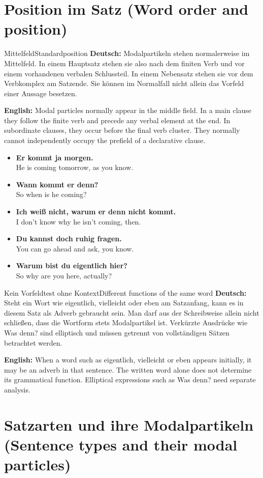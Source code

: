\documentclass[a4paper,11pt]{article}
\newcommand{\GermanText}[1]{\textbf{Deutsch: }#1\par}
\newcommand{\EnglishText}[1]{{\small\color{SoftGray}\textbf{English: }#1\par}}
\newcommand{\ExampleItem}[2]{\item \textbf{#1}\\{\small\color{SoftGray}#2}}
\begin{document}
\section{Position im Satz \textnormal{(Word order and position)}}
\begin{grammarentry}{Mittelfeld}{Standardposition}
\GermanText{Modalpartikeln stehen normalerweise im Mittelfeld. In einem Hauptsatz stehen sie also nach dem finiten Verb und vor einem vorhandenen verbalen Schlussteil. In einem Nebensatz stehen sie vor dem Verbkomplex am Satzende. Sie können im Normalfall nicht allein das Vorfeld einer Aussage besetzen.}
\EnglishText{Modal particles normally appear in the middle field. In a main clause they follow the finite verb and precede any verbal element at the end. In subordinate clauses, they occur before the final verb cluster. They normally cannot independently occupy the prefield of a declarative clause.}
\end{grammarentry}
\begin{exbox}\begin{itemize}
\ExampleItem{Er kommt ja morgen.}{He is coming tomorrow, as you know.}
\ExampleItem{Wann kommt er denn?}{So when is he coming?}
\ExampleItem{Ich weiß nicht, warum er denn nicht kommt.}{I don't know why he isn't coming, then.}
\ExampleItem{Du kannst doch ruhig fragen.}{You can go ahead and ask, you know.}
\ExampleItem{Warum bist du eigentlich hier?}{So why are you here, actually?}
\end{itemize}\end{exbox}
\begin{grammarentry}{Kein Vorfeldtest ohne Kontext}{Different functions of the same word}
\GermanText{Steht ein Wort wie eigentlich, vielleicht oder eben am Satzanfang, kann es in diesem Satz als Adverb gebraucht sein. Man darf aus der Schreibweise allein nicht schließen, dass die Wortform stets Modalpartikel ist. Verkürzte Ausdrücke wie Was denn? sind elliptisch und müssen getrennt von vollständigen Sätzen betrachtet werden.}
\EnglishText{When a word such as eigentlich, vielleicht or eben appears initially, it may be an adverb in that sentence. The written word alone does not determine its grammatical function. Elliptical expressions such as Was denn? need separate analysis.}
\end{grammarentry}
\section{Satzarten und ihre Modalpartikeln \textnormal{(Sentence types and their modal particles)}}
\end{document}
